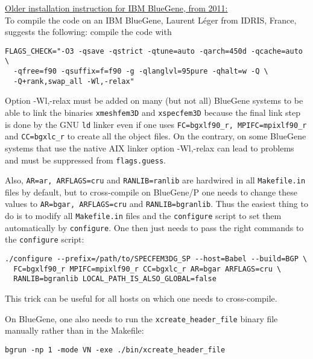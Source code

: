 \noindent \underline{Older installation instruction for IBM BlueGene, from 2011:}\\


\noindent To compile the code on an IBM BlueGene, Laurent L\'eger from
IDRIS, France, suggests the following: compile the code with
\begin{verbatim}
FLAGS_CHECK="-O3 -qsave -qstrict -qtune=auto -qarch=450d -qcache=auto \
  -qfree=f90 -qsuffix=f=f90 -g -qlanglvl=95pure -qhalt=w -Q \
  -Q+rank,swap_all -Wl,-relax"
\end{verbatim}

\noindent
Option \textquotedbl{}-Wl,-relax\textquotedbl{} must be
added on many (but not all) BlueGene systems to be able to link the
binaries \texttt{xmeshfem3D} and \texttt{xspecfem3D} because the final
link step is done by the GNU \texttt{ld} linker even if one uses \texttt{FC=bgxlf90\_r,
MPIFC=mpixlf90\_r} and \texttt{CC=bgxlc\_r} to create all the object
files. On the contrary, on some BlueGene systems that use the native
AIX linker option \textquotedbl{}-Wl,-relax\textquotedbl{} can lead
to problems and must be suppressed from \texttt{flags.guess}.

\noindent Also, \texttt{AR=ar, ARFLAGS=cru} and \texttt{RANLIB=ranlib}
are hardwired in all \texttt{Makefile.in} files by default, but to
cross-compile on BlueGene/P one needs to change these values to \texttt{AR=bgar,
ARFLAGS=cru} and \texttt{RANLIB=bgranlib}. Thus the easiest thing
to do is to modify all \texttt{Makefile.in} files and the \texttt{configure}
script to set them automatically by \texttt{configure}. One then just
needs to pass the right commands to the \texttt{configure} script:
\begin{verbatim}
./configure --prefix=/path/to/SPECFEM3DG_SP --host=Babel --build=BGP \
  FC=bgxlf90_r MPIFC=mpixlf90_r CC=bgxlc_r AR=bgar ARFLAGS=cru \
  RANLIB=bgranlib LOCAL_PATH_IS_ALSO_GLOBAL=false
\end{verbatim}

\noindent This trick can be useful for all hosts on which one needs
to cross-compile.

\noindent On BlueGene, one also needs to run the \texttt{xcreate\_header\_file}
binary file manually rather than in the Makefile:

\noindent
\begin{verbatim}
bgrun -np 1 -mode VN -exe ./bin/xcreate_header_file
\end{verbatim}


